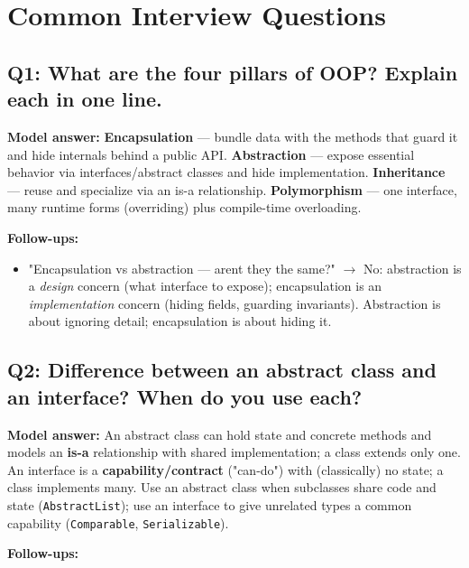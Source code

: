 \documentclass[11pt]{article}
\providecommand{\tightlist}{\setlength{\itemsep}{1pt}\setlength{\parskip}{0pt}}
\begin{document}
\section{Common Interview Questions}\label{common-interview-questions}

\subsection{Q1: What are the four pillars of OOP? Explain each in one line.}\label{q1-what-are-the-four-pillars-of-oop-explain-each-in-one-line}

\textbf{Model answer:} \textbf{Encapsulation} --- bundle data with the methods that guard it and hide internals behind a public API. \textbf{Abstraction} --- expose essential behavior via interfaces/abstract classes and hide implementation. \textbf{Inheritance} --- reuse and specialize via an is-a relationship. \textbf{Polymorphism} --- one interface, many runtime forms (overriding) plus compile-time overloading.

\textbf{Follow-ups:}

\begin{itemize}
\tightlist
\item
  "Encapsulation vs abstraction --- aren\textquotesingle t they the same?" \(\rightarrow\) No: abstraction is a \emph{design} concern (what interface to expose); encapsulation is an \emph{implementation} concern (hiding fields, guarding invariants). Abstraction is about ignoring detail; encapsulation is about hiding it.
\end{itemize}

\subsection{Q2: Difference between an abstract class and an interface? When do you use each?}\label{q2-difference-between-an-abstract-class-and-an-interface-when-do-you-use-each}

\textbf{Model answer:} An abstract class can hold state and concrete methods and models an \textbf{is-a} relationship with shared implementation; a class extends only one. An interface is a \textbf{capability/contract} ("can-do") with (classically) no state; a class implements many. Use an abstract class when subclasses share code and state (\texttt{AbstractList}); use an interface to give unrelated types a common capability (\texttt{Comparable}, \texttt{Serializable}).

\textbf{Follow-ups:}
\end{document}
